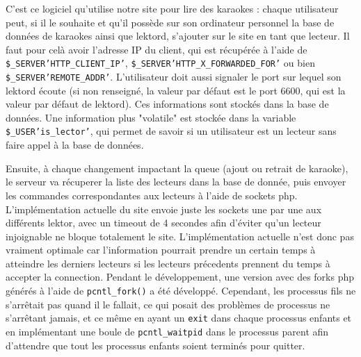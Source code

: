 C'est ce logiciel qu'utilise notre site pour lire des karaokes : chaque utilisateur peut, si il le souhaite et qu'il possède sur son ordinateur personnel la base de données de karaokes ainsi que lektord, s'ajouter sur le site en tant que lecteur. Il faut pour celà avoir l'adresse IP du client, qui est récupérée à l'aide de \texttt{\$\_SERVER\lbrack'HTTP\_CLIENT\_IP'\rbrack}, \texttt{\$\_SERVER\lbrack'HTTP\_X\_FORWARDED\_FOR'\rbrack} ou bien \texttt{\$\_SERVER\lbrack'REMOTE\_ADDR'\rbrack}.
L'utilisateur doit aussi signaler le port sur lequel son lektord écoute (si non renseigné, la valeur par défaut est le port 6600, qui est la valeur par défaut de lektord).
Ces informations sont stockés dans la base de données.
Une information plus "volatile" est stockée dans la variable \texttt{\$\_USER\lbrack'is\_lector'\rbrack}, qui permet de savoir si un utilisateur est un lecteur sans faire appel à la base de données.

Ensuite, à chaque changement impactant la queue (ajout ou retrait de karaoke), le serveur va récuperer la liste des lecteurs dans la base de donnée, puis envoyer les commandes correspondantes aux lecteurs à l'aide de sockets php.
L'implémentation actuelle du site envoie juste les sockets une par une aux différents lektor, avec un timeout de 4 secondes afin d'éviter qu'un lecteur injoignable ne bloque totalement le site. L'implémentation actuelle n'est donc pas vraiment optimale car l'information pourrait prendre un certain temps à atteindre les derniers lecteurs si les lecteurs précedents prennent du temps à accepter la connection. Pendant le développement, une version avec des forks php générés à l'aide de
\texttt{pcntl\_fork()} a été développé. Cependant, les processus fils ne s'arrêtait pas quand il le fallait, ce qui posait des problèmes de processus ne s'arrêtant jamais, et ce même en ayant un \texttt{exit} dans chaque processus enfants et en implémentant une boule de \texttt{pcntl_waitpid} dans le processus parent afin d'attendre que tout les processus enfants soient terminés pour quitter.
